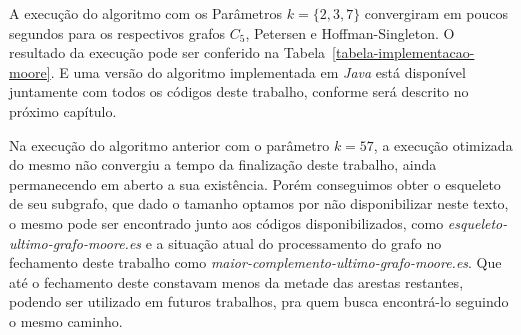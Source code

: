 \begin{algorithm2e}[h]
\SetAlFnt{\tiny}
\SetAlCapFnt{\small}
\SetAlCapNameFnt{\small}
\SetAlgoLined
\DontPrintSemicolon
\LinesNumbered
\BlankLine
{}
\caption{$ComplementaArestas(G(V_g,E_g),k)$}%
\label{alg-complmenta-arestas}
\end{algorithm2e}

A execução do algoritmo com os Parâmetros $k=\{2,3,7\}$ convergiram em poucos segundos para os respectivos grafos $C_5$, Petersen e Hoffman-Singleton. O resultado da execução pode ser conferido na Tabela~\ref{tabela-implementacao-moore}. E uma versão do algoritmo implementada em \textit{Java} está disponível juntamente com todos os códigos deste trabalho, conforme será descrito no próximo capítulo. 

Na execução do algoritmo anterior com o parâmetro $k=57$, a execução otimizada do mesmo não convergiu a tempo da finalização deste trabalho, ainda permanecendo em aberto a sua existência. Porém conseguimos obter o esqueleto de seu subgrafo, que dado o tamanho optamos por não disponibilizar neste texto, o mesmo pode ser encontrado junto aos códigos disponibilizados, como \textit{esqueleto-ultimo-grafo-moore.es} e a situação atual do processamento do grafo no fechamento deste trabalho como \textit{maior-complemento-ultimo-grafo-moore.es}. Que até o fechamento deste constavam menos da metade das arestas restantes, podendo ser utilizado em futuros trabalhos, pra quem busca encontrá-lo seguindo o mesmo caminho.

